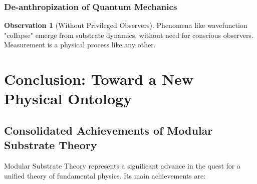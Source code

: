 \documentclass[11pt, a4paper]{article}
\theoremstyle{plain}
\theoremstyle{definition}
\newtheorem{observation}[theorem]{Observation}
\begin{document}
\subsubsection{De-anthropization of Quantum Mechanics}
\begin{observation}[Without Privileged Observers]
Phenomena like wavefunction "collapse" emerge from substrate dynamics, without need for conscious observers. Measurement is a physical process like any other.
\end{observation}


\section{Conclusion: Toward a New Physical Ontology}
\label{sec:conclusion}

\subsection{Consolidated Achievements of Modular Substrate Theory}

Modular Substrate Theory represents a significant advance in the quest for a unified theory of fundamental physics. Its main achievements are:
\end{document}

